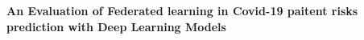 \documentclass[12pt]{article}
\begin{document}
 

\begin{center} \Large\bf
An Evaluation of Federated learning in Covid-19 paitent risks prediction with Deep Learning Models
\end{center} 
\end{document}
